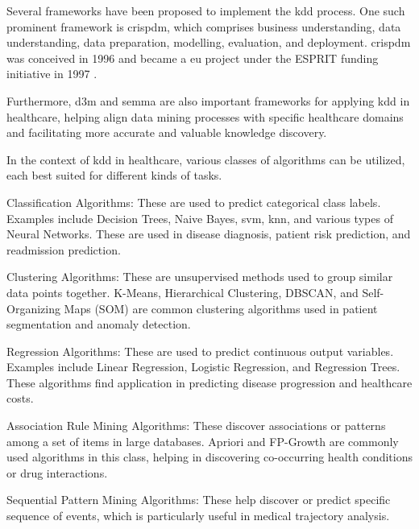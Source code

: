 Several frameworks have been proposed to implement the \ac{kdd} process. One such prominent framework is \ac{crispdm}, which comprises business understanding, data understanding, data preparation, modelling, evaluation, and deployment. \ac{crispdm} was conceived in 1996 and became a \ac{eu} project under the ESPRIT funding initiative in 1997 \cite{Chapman2000CRISPDM1S}. %

Furthermore, \ac{d3m} 
\cite{huangDataMiningIntegrated2009} and \ac{semma} \cite{rohanizadehProposedDataMining2009} are also important frameworks for applying \ac{kdd} in healthcare, helping align data mining processes with specific healthcare domains and facilitating more accurate and valuable knowledge discovery.

In the context of \ac{kdd} in healthcare, various classes of algorithms can be utilized, each best suited for different kinds of tasks.

Classification Algorithms: These are used to predict categorical class labels. Examples include Decision Trees, Naive Bayes, \ac{svm}, \ac{knn}, and various types of Neural Networks. These are used in disease diagnosis, patient risk prediction, and readmission prediction.

Clustering Algorithms: These are unsupervised methods used to group similar data points together. K-Means, Hierarchical Clustering, DBSCAN, and Self-Organizing Maps (SOM) are common clustering algorithms used in patient segmentation and anomaly detection.

Regression Algorithms: These are used to predict continuous output variables. Examples include Linear Regression, Logistic Regression, and Regression Trees. These algorithms find application in predicting disease progression and healthcare costs.

Association Rule Mining Algorithms: These discover associations or patterns among a set of items in large databases. Apriori and FP-Growth are commonly used algorithms in this class, helping in discovering co-occurring health conditions or drug interactions.

Sequential Pattern Mining Algorithms: These help discover or predict specific sequence of events, which is particularly useful in medical trajectory analysis.

